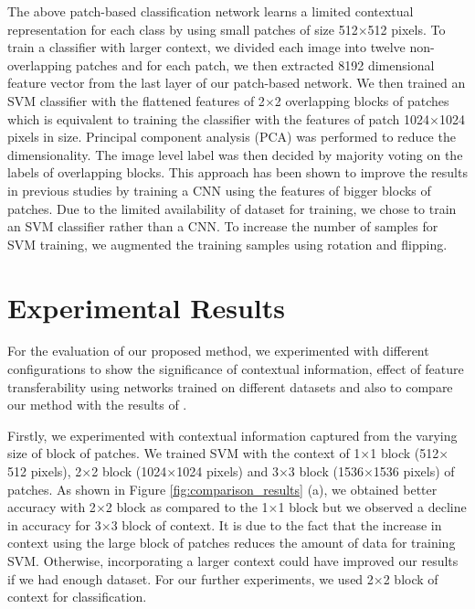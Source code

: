 \documentclass[runningheads,a4paper]{llncs}
\begin{document}
The above patch-based classification network learns a limited contextual representation for each class by using small patches of size 512$\times$512 pixels. To train a classifier with larger context, we divided each image into twelve non-overlapping patches and for each patch, we then extracted 8192 dimensional feature vector from the last layer of our patch-based network. We then trained an SVM classifier with the flattened features of 2$\times$2 overlapping blocks of patches which is equivalent to training the classifier with the features of patch 1024$\times$1024 pixels in size. Principal component analysis (PCA) was performed to reduce the dimensionality. The image level label was then decided by majority voting on the labels of overlapping blocks. This approach has been shown to improve the results in previous studies by training a CNN using the features of bigger blocks of patches. Due to the limited availability of dataset for training, we chose to train an SVM classifier rather than a CNN. To increase the number of samples for SVM training, we augmented the training samples using rotation and flipping.
 
\section{Experimental Results}

For the evaluation of our proposed method, we experimented with different configurations to show the significance of contextual information, effect of feature transferability using networks trained on different datasets and also to compare our method with the results of \cite{araujo2017classification}.

Firstly, we experimented with contextual information captured from the varying size of block of patches. We trained SVM with the context of 1$\times$1 block (512$\times$512 pixels), 2$\times$2 block (1024$\times$1024 pixels) and 3$\times$3 block (1536$\times$1536 pixels) of patches. As shown in Figure \ref{fig:comparison_results} (a), we obtained better accuracy with 2$\times$2 block as compared to the 1$\times$1 block but we observed a decline in accuracy for 3$\times$3 block of context. It is due to the fact that the increase in context using the large block of patches reduces the amount of data for training SVM. Otherwise, incorporating a larger context could have improved our results if we had enough dataset. For our further experiments, we used 2$\times$2 block of context for classification.
\end{document}
